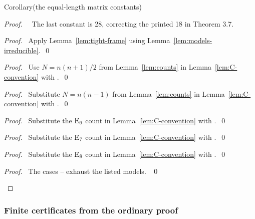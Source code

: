 \begin{namedresult}{Corollary}{(the equal-length matrix constants)}\label{cor:rem-constants}
\end{namedresult}
\begin{proof}
\pfsketch\ \repair\ The last constant is 28, correcting the printed
18 in Theorem 3.7.
\begin{proof}\pf\ Apply Lemma~\ref{lem:tight-frame} using
Lemma~\ref{lem:models-irreducible}.~\qed\end{proof}
\begin{proof}\pf\ Use $N=n(n+1)/2$ from Lemma~\ref{lem:counts}
in Lemma~\ref{lem:C-convention} with .~\qed\end{proof}
\begin{proof}\pf\ Substitute $N=n(n-1)$ from Lemma~\ref{lem:counts}
in Lemma~\ref{lem:C-convention} with .~\qed\end{proof}
\begin{proof}\pf\ Substitute the $\mathrm{E}_6$ count in
Lemma~\ref{lem:C-convention} with .~\qed\end{proof}
\begin{proof}\pf\ Substitute the $\mathrm{E}_7$ count in
Lemma~\ref{lem:C-convention} with .~\qed\end{proof}
\begin{proof}\pf\ Substitute the $\mathrm{E}_8$ count in
Lemma~\ref{lem:C-convention} with .~\qed\end{proof}
\qedstep
\begin{proof}\pf\ The cases --
exhaust the listed models. ~\qed\end{proof}
\end{proof}

\subsubsection{Finite certificates from the ordinary proof}

